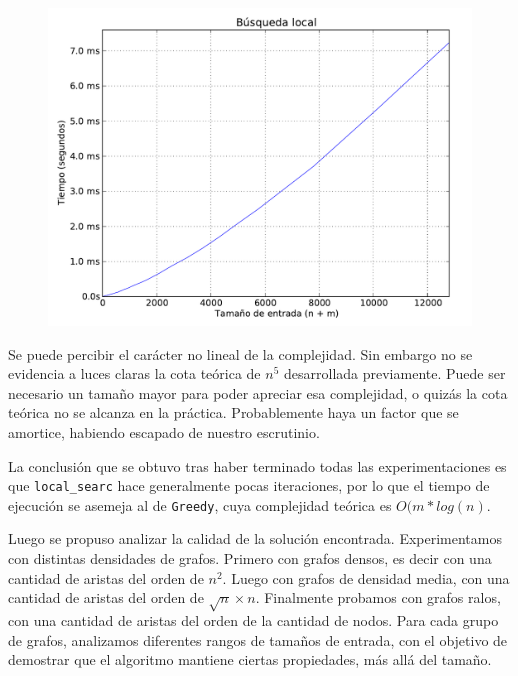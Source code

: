 \begin{figure}[H]
\begin{center}
\includegraphics[angle=0, scale=.75]{imagenes/local_search_time.pdf}
\label{grafico local}
\end{center}
\end{figure}


Se puede percibir el carácter no lineal de la complejidad. Sin embargo no se evidencia a luces claras la cota teórica de $n^5$ desarrollada
previamente. Puede ser necesario un tamaño mayor para poder apreciar esa complejidad, o quizás la cota teórica no se alcanza en la práctica.
Probablemente haya un factor que se amortice, habiendo escapado de nuestro escrutinio.

La conclusión que se obtuvo tras haber terminado todas las experimentaciones es que \texttt{local\_searc} hace generalmente pocas iteraciones, por lo que el tiempo de ejecución se asemeja al de \texttt{Greedy}, cuya complejidad teórica es $O(m*log(n)$.

\newpage
Luego se propuso analizar la calidad de la solución encontrada.
Experimentamos con distintas densidades de grafos. Primero con grafos densos, es decir con una cantidad de aristas del orden de $n^2$. Luego con
grafos de densidad media, con una cantidad de aristas del orden de $\sqrt{n} \times n$. Finalmente probamos con grafos ralos, con una cantidad de aristas
del orden de la cantidad de nodos. Para cada grupo de grafos, analizamos diferentes rangos de tamaños de entrada, con el objetivo de demostrar
que el algoritmo mantiene ciertas propiedades, más allá del tamaño.


